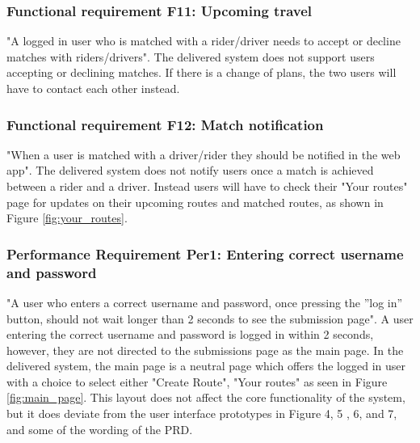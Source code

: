 \documentclass{article}
\begin{document}
\subsubsection{Functional requirement F11: Upcoming travel}
"A logged in user who is matched with a rider/driver needs to accept or decline matches with riders/drivers"\cite{PRD}. The delivered system does not support users accepting or declining matches. If there is a change of plans, the two users will have to contact each other instead.

\subsubsection{Functional requirement F12: Match notification}
"When a user is matched with a driver/rider they should be notified in the web app"\cite{PRD}. The delivered system does not notify users once a match is achieved between a rider and a driver. Instead users will have to check their "Your routes" page for updates on their upcoming routes and matched routes, as shown in Figure \ref{fig:your_routes}.


\subsubsection{Performance Requirement Per1: Entering correct username and password}
"A user who enters a correct username and password, once pressing the ”log in” button, should not wait longer than 2 seconds to see the submission page"\cite{PRD}. A user entering the correct username and password is logged in within 2 seconds, however, they are not directed to the submissions page as the main page. In the delivered system, the main page is a neutral page which offers the logged in user with a choice to select either "Create Route", "Your routes" as seen in Figure \ref{fig:main_page}. This layout does not affect the core functionality of the system, but it does deviate from the user interface prototypes in Figure 4, 5 , 6, and 7, and some of the wording of the PRD\cite{PRD}.
\end{document}
